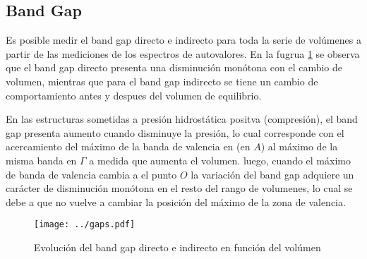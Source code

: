 \subsection{Band Gap}
Es posible medir el band gap directo e indirecto para toda la serie de volúmenes a 
partir de las mediciones de los espectros de autovalores. En la fugrua 
\ref{FigureBandGapvsVol} se observa
que el band gap directo presenta una disminución monótona con el cambio
de volumen, mientras que para el band gap indirecto se tiene un cambio de comportamiento
antes y despues del volumen de equilibrio.

En las estructuras sometidas a presión hidrostática positva (compresión), 
el band gap presenta aumento cuando disminuye la presión, lo cual corresponde
con el acercamiento del máximo de la banda de valencia en (en $A$) al máximo de la 
misma banda en $\Gamma$ a medida que aumenta el volumen. luego, cuando el
máximo de banda de valencia cambia a el punto $O$ la variación del 
band gap adquiere un carácter de disminución monótona en el resto del 
rango de volumenes, lo cual se debe a que no vuelve a cambiar la posición 
del máximo de la zona de valencia.

\begin{figure}

  \texttt{[image: ../gaps.pdf]}
  \caption{
    \protect\label{FigureBandGapvsVol}
    Evolución del band gap directo e indirecto en función del volúmen
  }

\end{figure}

